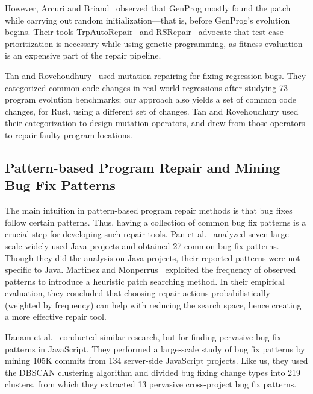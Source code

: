 However, Arcuri and Briand~\cite{arcuri2011practical} observed that GenProg mostly found the patch while carrying out random initialization---that is, before GenProg's evolution begins. Their tools TrpAutoRepair~\cite{qi2013efficient} and RSRepair~\cite{qi2014strength} advocate that test case prioritization is necessary while using genetic programming, as fitness evaluation is an expensive part of the repair pipeline.

Tan and Rovehoudhury~\cite{tan2015relifix} used mutation repairing for fixing regression bugs. They categorized common code changes in real-world regressions after studying 73 program evolution benchmarks; our approach also yields a set of common code changes, for Rust, using a different set of changes. Tan and Rovehoudhury used their categorization to design mutation operators, and drew from those operators to repair faulty program locations.

\subsection{Pattern-based Program Repair and Mining Bug Fix Patterns}

The main intuition in pattern-based program repair methods is that bug fixes follow certain patterns. Thus, having a collection of common bug fix patterns is a crucial step for developing such repair tools. Pan et al.~\cite{pan2009toward} analyzed seven large-scale widely used Java projects and obtained 27 common bug fix patterns. Though they did the analysis on Java projects, their reported patterns were not specific to Java. Martinez and Monperrus~\cite{martinez2015mining,martinez2012mining} exploited the frequency of observed patterns to introduce a heuristic patch searching method. In their empirical evaluation, they concluded that choosing repair actions probabilistically (weighted by frequency) can help with reducing the search space, hence creating a more effective repair tool.

Hanam et al.~\cite{hanam2016discovering} conducted similar research, but for finding pervasive bug fix patterns in JavaScript. They performed a large-scale study of bug fix patterns by mining 105K commits from 134 server-side JavaScript projects. Like us, they used the DBSCAN clustering algorithm and divided bug fixing change types into 219 clusters, from which they extracted 13 pervasive cross-project bug fix patterns. 

